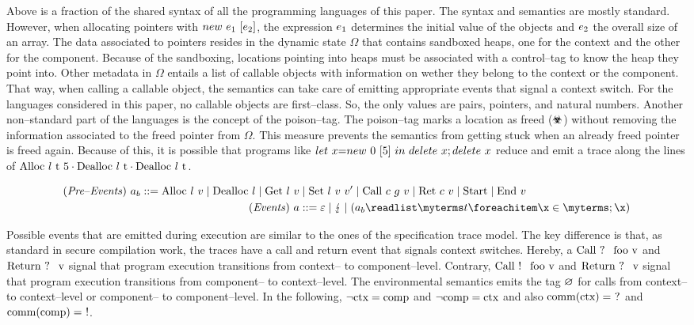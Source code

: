 \documentclass[utf8,acmsmall,review,screen,dvipsnames]{acmart}
\begin{document}
Above is a fraction of the shared syntax of all the programming languages of this paper.
The syntax and semantics are mostly standard.
However, when allocating pointers with $\lnew{\expr[_{1}]}{\expr[_{2}]}$, the expression $\expr[_{1}]$ determines the initial value of the objects and $\expr[_{2}]$ the overall size of an array.
The data associated to pointers resides in the dynamic state $\Omega$ that contains sandboxed heaps, one for the context and the other for the component.
Because of the sandboxing, locations pointing into heaps must be associated with a control--tag to know the heap they point into.
Other metadata in $\Omega$ entails a list of callable objects with information on wether they belong to the context or the component.
That way, when calling a callable object, the semantics can take care of emitting appropriate events that signal a context switch.
For the languages considered in this paper, no callable objects are first--class.
So, the only values are pairs, pointers, and natural numbers.
Another non--standard part of the languages is the concept of the poison--tag.
The poison--tag marks a location as freed ($\poisoned$) without removing the information associated to the freed pointer from $\Omega$.
This measure prevents the semantics from getting stuck when an already freed pointer is freed again.
Because of this, it is possible that programs like $\llet{x}{\lnew{0}{5}}{\ldelete{x};\ldelete{x}}$ reduce and emit a trace along the lines of $\ev{Alloc\ \loc\ \sandboxtag\ 5}\cdot\ev{Dealloc\ \loc\ \sandboxtag}\cdot\ev{Dealloc\ \loc\ \sandboxtag}$.

\begin{gather*}
  \begin{aligned}
  \mi{(Pre\text{--}Events)}~\event[_{b}]\bnfdef \ev{Alloc}\ \loc\ \valueexpr \mid \ev{Dealloc}\ \loc \mid \ev{Get}\ \loc\ \valueexpr &\mid \ev{Set}\ \loc\ \valueexpr\ \valueexpr['] \mid \ev{Call}\ \comm\ g\ \valueexpr \mid \ev{Ret}\ \comm\ \valueexpr \mid \ev{Start} \mid \ev{End}\ \valueexpr \\
  \mi{(Events)}~\event&\bnfdef \emptyevent \mid \lightning \mid \tup{\event[_{b}]}{\sandboxtag} \\
  \end{aligned}
\end{gather*}

Possible events that are emitted during execution are similar to the ones of the specification trace model.
The key difference is that, as standard in secure compilation work, the traces have a call and return event that signals context switches.
Hereby, a $\ev{Call\ \ctxtocomp\ foo\ \valueexpr}$ and $\ev{Return\ \ctxtocomp\ \valueexpr}$ signal that program execution transitions from context-- to component--level.
Contrary, $\ev{Call\ \comptoctx\ foo\ \valueexpr}$ and $\ev{Return\ \ctxtocomp\ \valueexpr}$ signal that program execution transitions from component-- to context--level.
The environmental semantics emits the tag $\nocomm$ for calls from context-- to context--level or component-- to component--level.
In the following, $\neg\ctx=\comp$ and $\neg\comp=\ctx$ and also $\operatorname{comm}(\ctx)=\ \ctxtocomp$ and $\operatorname{comm}(\comp)=\ \comptoctx$.
\end{document}
